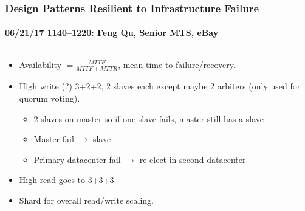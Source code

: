 \documentclass[xcolor=dvipsnames, 9pt]{beamer}
\begin{document}
\begin{frame}
    \frametitle{Design Patterns Resilient to Infrastructure Failure}
    \framesubtitle{%
        06/21/17 1140--1220:
        Feng Qu, Senior MTS, eBay
    }
    \begin{columns}
        \begin{column}{0.5\textwidth}
            \begin{itemize}
                \item Availability $=\frac{MTTF}{MTTF + MTTR}$, mean time to
                    failure/recovery.
                \item High write (?) 3+2+2, 2 slaves each except maybe 2
                    arbiters (only used for quorum voting).
                    \begin{itemize}
                        \item 2 slaves on master so if one slave fails, master
                            still has a slave
                        \item Master fail $\to$ slave
                        \item Primary datacenter fail $\to$ re-elect in second
                            datacenter
                    \end{itemize}
                \item High read goes to 3+3+3
                \item Shard for overall read/write scaling.
            \end{itemize}
        \end{column}

\end{columns}
\end{frame}
\end{document}
